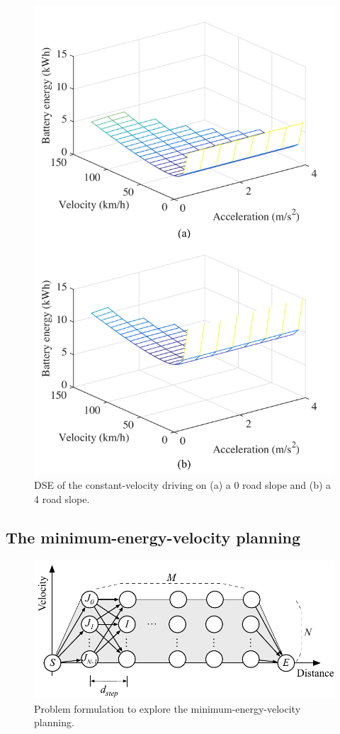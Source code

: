 \documentclass{IEEEtran}
\begin{document}
\begin{figure} %
\centering
\includegraphics[width=0.85\hsize]{Figures/Design_space_exploration.pdf}
\caption{DSE of  the constant-velocity driving on (a) a 0 road slope and (b) a 4 road slope.}
\label{fig:DSE}
\end{figure} 

\subsection{The minimum-energy-velocity planning} \label{subsec:variable drive}

\begin{figure} [h]%
\center
\includegraphics[width=0.85\hsize]{Figures/Opt_drive_problem.pdf}
\caption{Problem formulation to explore the minimum-energy-velocity planning.}
\label{fig:Opt_drive_problem}
\end{figure}
\end{document}

